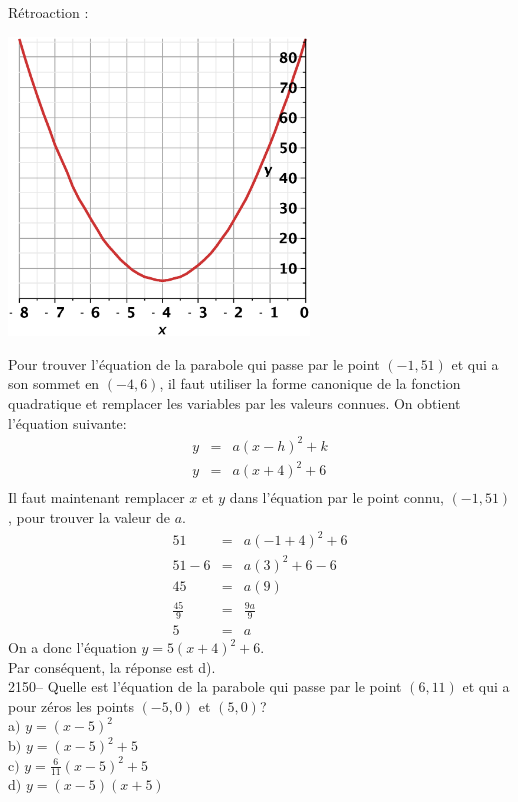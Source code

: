 \documentclass[letterpaper, 12pt]{article}
\begin{document}
R\'etroaction :\\
\begin{center}
 \includegraphics[width=8cm,bb=20 118 575 673]{Q2149.eps}
\end{center}
Pour trouver l'\'equation de la parabole qui passe par le point $(-1, 51)$ et qui a son sommet en \mbox{$(-4, 6)$}, il faut utiliser la forme canonique de la fonction quadratique et remplacer les variables par les valeurs connues. On obtient l'\'equation suivante:
\begin{eqnarray*}
 y&=&a(x-h)^{2}+k\\
 y&=&a(x+4)^{2}+6\\
\end{eqnarray*}
Il faut maintenant remplacer $x$  et $y$ dans l'\'equation par le point connu, $(-1, 51)$, pour trouver la valeur de $a$.
\begin{eqnarray*}
 51&=&a(-1+4)^{2}+6\\
 51-6&=&a(3)^{2}+6-6\\
 45&=&a(9)\\[2mm]
 \frac{45}{9}&=&\frac{9a}{9}\\[2mm]
5&=&a
\end{eqnarray*}
On a donc l'\'equation $y= 5(x+4)^{2}+6$.\\
Par cons\'equent, la r\'eponse est d).\\


2150-- Quelle est l'\'equation de la parabole qui passe par le point $(6, 11)$ et qui a pour z\'eros les points $(-5, 0)$ et $(5, 0)$? \\

a$)$ $y=(x-5)^{2}$\\[2mm]
b$)$ $y=(x-5)^{2}+5$\\[2mm]
c$)$ $y=\frac{6}{11}(x-5)^{2}+5$\\[2mm]
d$)$ $y=(x-5)(x+5)$\\
\end{document}
